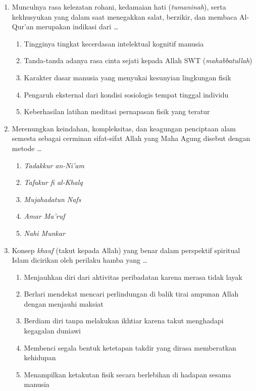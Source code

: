 \documentclass[12pt,a4paper]{article}
\begin{document}
\begin{enumerate}[leftmargin=*]

\item Munculnya rasa kelezatan rohani, kedamaian hati (\textit{tumaninah}), serta kekhusyukan yang dalam saat menegakkan salat, berzikir, dan membaca Al-Qur'an merupakan indikasi dari \dots
    \begin{enumerate}[label=\alph*.]
        \item Tingginya tingkat kecerdasan intelektual kognitif manusia
        \item Tanda-tanda adanya rasa cinta sejati kepada Allah SWT (\textit{mahabbatullah})
        \item Karakter dasar manusia yang menyukai kesunyian lingkungan fisik
        \item Pengaruh eksternal dari kondisi sosiologis tempat tinggal individu
        \item Keberhasilan latihan meditasi pernapasan fisik yang teratur
    \end{enumerate}

\item Merenungkan keindahan, kompleksitas, dan keagungan penciptaan alam semesta sebagai cerminan sifat-sifat Allah yang Maha Agung disebut dengan metode \dots
    \begin{enumerate}[label=\alph*.]
        \item \textit{Tadakkur an-Ni'am}
        \item \textit{Tafakur fi al-Khalq}
        \item \textit{Mujahadatun Nafs}
        \item \textit{Amar Ma'ruf}
        \item \textit{Nahi Munkar}
    \end{enumerate}

\item Konsep \textit{khauf} (takut kepada Allah) yang benar dalam perspektif spiritual Islam dicirikan oleh perilaku hamba yang \dots
    \begin{enumerate}[label=\alph*.]
        \item Menjauhkan diri dari aktivitas peribadatan karena merasa tidak layak
        \item Berlari mendekat mencari perlindungan di balik tirai ampunan Allah dengan menjauhi maksiat
        \item Berdiam diri tanpa melakukan ikhtiar karena takut menghadapi kegagalan duniawi
        \item Membenci segala bentuk ketetapan takdir yang dirasa memberatkan kehidupan
        \item Menampilkan ketakutan fisik secara berlebihan di hadapan sesama manusia
    \end{enumerate}


\end{enumerate}
\end{document}
